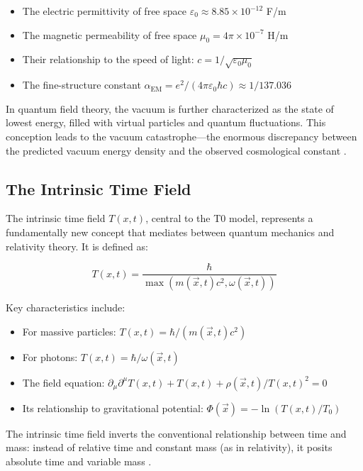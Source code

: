 \documentclass[12pt,a4paper]{article}
\newcommand{\Tfieldt}{T(x,t)}
\newcommand{\alphaEM}{\alpha_{\text{EM}}}
\newcommand{\Tzero}{T_0}
\newcommand{\vecx}{\vec{x}}
\begin{document}
	\begin{itemize}
		\item The electric permittivity of free space $\varepsilon_0 \approx 8.85 \times 10^{-12}$ F/m
		\item The magnetic permeability of free space $\mu_0 = 4\pi \times 10^{-7}$ H/m
		\item Their relationship to the speed of light: $c = 1/\sqrt{\varepsilon_0\mu_0}$
		\item The fine-structure constant $\alphaEM = e^2/(4\pi\varepsilon_0\hbar c) \approx 1/137.036$
	\end{itemize}
	
	In quantum field theory, the vacuum is further characterized as the state of lowest energy, filled with virtual particles and quantum fluctuations. This conception leads to the vacuum catastrophe—the enormous discrepancy between the predicted vacuum energy density and the observed cosmological constant \cite{Weinberg1989}.
	
	\subsection{The Intrinsic Time Field}
	\label{subsec:time_field}
	
	The intrinsic time field $\Tfieldt$, central to the T0 model, represents a fundamentally new concept that mediates between quantum mechanics and relativity theory. It is defined as:
	
	\begin{equation}
		\Tfieldt = \frac{\hbar}{\max(m(\vecx,t)c^2, \omega(\vecx,t))}
	\end{equation}
	
	Key characteristics include:
	
	\begin{itemize}
		\item For massive particles: $\Tfieldt = \hbar/(m(\vecx,t)c^2)$
		\item For photons: $\Tfieldt = \hbar/\omega(\vecx,t)$
		\item The field equation: $\partial_{\mu}\partial^{\mu}\Tfieldt + \Tfieldt + \rho(\vecx,t)/\Tfieldt^2 = 0$
		\item Its relationship to gravitational potential: $\Phi(\vecx) = -\ln(\Tfieldt/\Tzero)$
	\end{itemize}
	
	The intrinsic time field inverts the conventional relationship between time and mass: instead of relative time and constant mass (as in relativity), it posits absolute time and variable mass \cite{pascher_part1_2025}.
	
\end{document}
